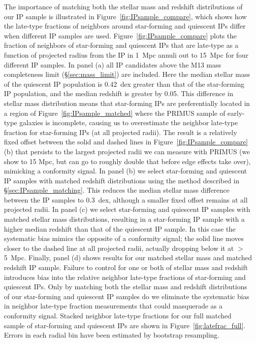 The importance of matching both the stellar mass and redshift distributions of our IP sample is illustrated in Figure~\ref{fig:IPsample_compare}, which shows how the late-type
fractions of neighbors around star-forming and quiescent IPs differ when different IP samples are used.
Figure~\ref{fig:IPsample_compare} plots the fraction of neighbors of star-forming and quiescent IPs that are late-type as a function of projected radius from the IP in 1~Mpc
annuli out to 15~Mpc for four different IP samples.
%
In panel (a) all IP candidates above the M13 mass completeness limit (\S\ref{sec:mass_limit}) are included.
Here the median stellar mass of the quiescent IP population is 0.42~dex greater than that of the star-forming IP population, and the median redshift is greater by 0.05.
This difference in stellar mass distribution means that star-forming IPs are preferentially located in a region of Figure~\ref{fig:IPsample_matched} where the PRIMUS sample of
early-type galaxies is incomplete, causing us to overestimate the neighbor late-type fraction for star-forming IPs (at all projected radii).
The result is a relatively fixed offset between the solid and dashed lines in Figure~\ref{fig:IPsample_compare}(b) that persists to the largest projected radii we can measure
with PRIMUS (we show to 15 Mpc, but can go to roughly double that before edge effects take over), mimicking a conformity signal.
%
In panel (b) we select star-forming and quiescent IP samples with matched redshift distributions using the method described in \S\ref{sec:IPsample_matching}.
This reduces the median stellar mass difference between the IP samples to 0.3~dex, although a smaller fixed offset remains at all projected radii.
%
In panel (c) we select star-forming and quiescent IP samples with matched stellar mass distributions, resulting in a star-forming IP sample with a higher median redshift than
that of the quiescent IP sample.
In this case the systematic bias mimics the opposite of a conformity signal; the solid line moves closer to the dashed line at all projected radii, actually dropping below it
at $>$5~Mpc.
%
Finally, panel (d) shows results for our matched stellar mass and matched redshift IP sample.
Failure to control for one or both of stellar mass and redshift introduces bias into the relative neighbor late-type fractions of star-forming and quiescent IPs.
Only by matching both the stellar mass and redshift distributions of our star-forming and quiescent IP samples do we eliminate the systematic bias in neighbor late-type fraction
measurements that could masquerade as a conformity signal.
Stacked neighbor late-type fractions for our full matched sample of star-forming and quiescent IPs are shown in Figure~\ref{fig:latefrac_full}.
Errors in each radial bin have been estimated by bootstrap resampling.

